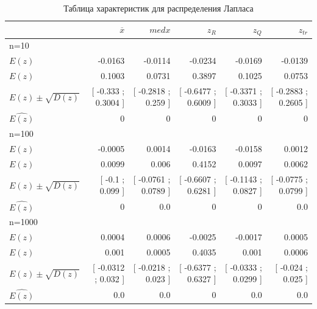 \documentclass[a4paper,14pt]{article}
\begin{document}
	\begin{table}[H]
		\centering
		\begin{tabular}[t]{|l|r|r|r|r|r|}
			\hline
			& $\overline{x}$ & $med x$ & $z_R$ & $z_Q$ & $z_{tr}$\\\hline\hline
			n=10 & & & & &\\\hline
			$E(z)$  & -0.0163 & -0.0114 & -0.0234 & -0.0169 & -0.0139  \\\hline
$E(z)$  & 0.1003 & 0.0731 & 0.3897 & 0.1025 & 0.0753  \\\hline
$E(z)  \pm  \sqrt{D(z)}$  & [ -0.333 ; 0.3004 ] & [ -0.2818 ; 0.259 ] & [ -0.6477 ; 0.6009 ] & [ -0.3371 ; 0.3033 ] & [ -0.2883 ; 0.2605 ]  \\\hline
			$\hat{E(z)}$ & 0 & 0 & 0 & 0 & 0\\\hline
			
			n=100 & & & & &\\\hline
			$E(z)$  & -0.0005 & 0.0014 & -0.0163 & -0.0158 & 0.0012  \\\hline
$E(z)$  & 0.0099 & 0.006 & 0.4152 & 0.0097 & 0.0062  \\\hline
$E(z)  \pm  \sqrt{D(z)}$  & [ -0.1 ; 0.099 ] & [ -0.0761 ; 0.0789 ] & [ -0.6607 ; 0.6281 ] & [ -0.1143 ; 0.0827 ] & [ -0.0775 ; 0.0799 ]  \\\hline
			$\hat{E(z)}$ & 0 & 0.0 & 0 & 0 & 0.0\\\hline
			
			n=1000 & & & & &\\\hline
			$E(z)$  & 0.0004 & 0.0006 & -0.0025 & -0.0017 & 0.0005  \\\hline
$E(z)$  & 0.001 & 0.0005 & 0.4035 & 0.001 & 0.0006  \\\hline
$E(z)  \pm  \sqrt{D(z)}$  & [ -0.0312 ; 0.032 ] & [ -0.0218 ; 0.023 ] & [ -0.6377 ; 0.6327 ] & [ -0.0333 ; 0.0299 ] & [ -0.024 ; 0.025 ]  \\\hline
			$\hat{E(z)}$ & 0.0 & 0.0 & 0 & 0.0 & 0.0\\\hline
			
		\end{tabular}
		\caption{Таблица характеристик для распределения Лапласа}
		\label{tab:laplace}
	\end{table}
	
\end{document}
